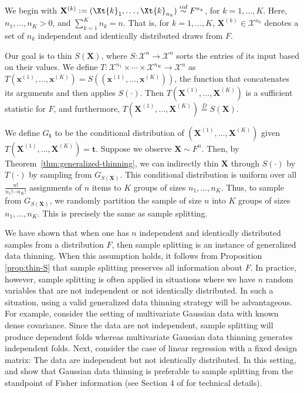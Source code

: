 \documentclass[12pt]{article}
\begin{document}
\begin{exmp} \label{ex:samplesplit}
We begin with $\mathbf{X}^{(k)} := (\Xt{k}_{1},\ldots,\Xt{k}_{n_k}) \overset{iid}{\sim} F^{n_k}$, for $k=1,\ldots,K$. Here, 
$n_1,\ldots,n_K >0$, 
 and $\sum_{k=1}^K n_k=n$. 
 That is, 
for $k=1,\ldots,K$, $\mathbf{X}^{(k)}\in\mathcal X^{n_k}$ denotes a set of $n_k$ independent and identically distributed draws from $F$.

Our goal is to thin $S(\mathbf{X})$, where $S:\mathcal X^n\to\mathcal X^n$ sorts the entries of its input based on their values.
We define $T:\mathcal X^{n_1}\times\cdots\times \mathcal X^{n_K}\to \mathcal X^n$ as
$T(\mathbf{x}^{(1)},\ldots,\mathbf{x}^{(K)})=S((\mathbf{x}^{(1)},\ldots,\mathbf{x}^{(K)}))$,
the function that  concatenates its arguments and then applies $S(\cdot)$. 
Then $T(\mathbf{X}^{(1)},\ldots,\mathbf{X}^{(K)})$ is a sufficient statistic for $F$, and 
furthermore, $T(\mathbf{X}^{(1)},\ldots,\mathbf{X}^{(K)}) \overset{D}{=} S(\mathbf{X})$. 

We define $G_{\mathbf{t}}$ to be the conditional distribution of $(\mathbf{X}^{(1)},\ldots,\mathbf{X}^{(K)})$ given $  T(\mathbf{X}^{(1)},\ldots,\mathbf{X}^{(K)})=\mathbf{t}$. Suppose we observe $\mathbf{X}\sim F^n$. 
Then, by Theorem~\ref{thm:generalized-thinning}, we can indirectly thin $\mathbf{X}$ through $S(\cdot)$ by $T(\cdot)$ by sampling from $G_{S(\mathbf{X})}$. This conditional distribution is uniform over all   
$\frac{n!}{n_1!\cdots n_K!}$ assignments of $n$ items to $K$ groups of sizes $n_1,\ldots,n_K$. Thus, to sample from $G_{S(\mathbf{X})}$, we randomly partition the sample of size $n$ into $K$ groups of sizes $n_1,\ldots,n_K$.
This is precisely the same as sample splitting. 
\end{exmp}

We have shown that when one has $n$ independent and identically distributed samples from a distribution $F$, then sample splitting is an instance of generalized data thinning. When this assumption holds, it follows from Proposition \ref{prop:thin-S} that sample splitting preserves all information about $F$.  In practice, however, sample splitting is often applied in situations where we have $n$ random variables that are not independent or not identically distributed. In such a situation, using a valid generalized data thinning strategy will be advantageous. For example, consider the setting of multivariate Gaussian data with known dense covariance. Since the data are not independent, sample splitting will produce dependent folds whereas multivariate Gaussian data thinning generates independent folds. Next, consider the case of linear regression with a fixed design matrix: The data are independent but not identically distributed. In this setting, \cite{neufeld2023data} and \cite{rasines2021splitting} show that Gaussian data thinning is preferable to sample splitting from the standpoint of Fisher information (see Section 4 of \cite{neufeld2023data} for technical details).
\end{document}
